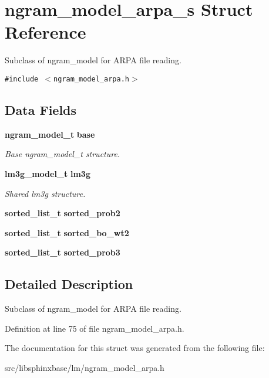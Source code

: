 \section{ngram\_\-model\_\-arpa\_\-s Struct Reference}
\label{structngram__model__arpa__s}
Subclass of ngram\_\-model for ARPA file reading.  


{\tt \#include $<$ngram\_\-model\_\-arpa.h$>$}

\subsection*{Data Fields}
\begin{CompactItemize}
\item 
{\bf ngram\_\-model\_\-t} {\bf base}\label{structngram__model__arpa__s_b09caa709057492ca333e7349e006c5d}

\begin{CompactList}\small\item\em Base ngram\_\-model\_\-t structure. \item\end{CompactList}\item 
{\bf lm3g\_\-model\_\-t} {\bf lm3g}\label{structngram__model__arpa__s_be1aa64587afdcb6134c0efaad622e78}

\begin{CompactList}\small\item\em Shared lm3g structure. \item\end{CompactList}\item 
{\bf sorted\_\-list\_\-t} \textbf{sorted\_\-prob2}\label{structngram__model__arpa__s_3ce912671b868fa1ebc556c0776e2246}

\item 
{\bf sorted\_\-list\_\-t} \textbf{sorted\_\-bo\_\-wt2}\label{structngram__model__arpa__s_d1cc307815c424daee1ea93a7192228d}

\item 
{\bf sorted\_\-list\_\-t} \textbf{sorted\_\-prob3}\label{structngram__model__arpa__s_4975e5e7a036df540a27a19dce588388}

\end{CompactItemize}


\subsection{Detailed Description}
Subclass of ngram\_\-model for ARPA file reading. 

Definition at line 75 of file ngram\_\-model\_\-arpa.h.

The documentation for this struct was generated from the following file:\begin{CompactItemize}
\item 
src/libsphinxbase/lm/ngram\_\-model\_\-arpa.h\end{CompactItemize}
